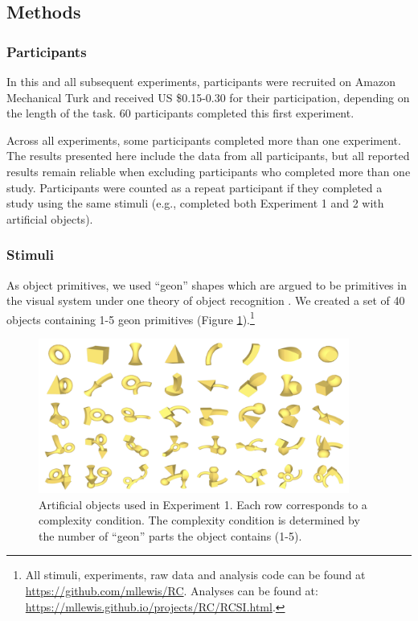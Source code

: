 \subsection{Methods}

\subsubsection{Participants} In this and all subsequent experiments, participants were recruited on Amazon Mechanical Turk and received US \$0.15-0.30 for their participation, depending on the length of the task. 60 participants completed this first experiment.

Across all experiments, some participants completed more than one experiment. The results presented here include the data from all participants, but all reported results remain reliable when excluding participants who completed more than one study. Participants were counted as a repeat participant if they completed a study using the same stimuli (e.g., completed both Experiment 1 and 2 with artificial objects).

\subsubsection{Stimuli}
As object primitives, we used ``geon'' shapes which are argued to be primitives in the visual system under one theory of object recognition \cite{biederman1987}. We created a set of 40 objects containing 1-5 geon primitives (Figure \ref{fig:geons}).\footnote{All stimuli, experiments, raw data and analysis code can be found at \url{https://github.com/mllewis/RC}.
Analyses can be found at: \url{https://mllewis.github.io/projects/RC/RCSI.html}.}

\begin{figure}
 \begin{center}
  \includegraphics[height=2in]{figs/geon_stimuli.png}
  \caption{\label{fig:geons} Artificial objects used in Experiment 1. Each row corresponds to a complexity condition. The complexity condition is determined by the number of ``geon'' parts the object contains (1-5). }
 \end{center}
\end{figure}

